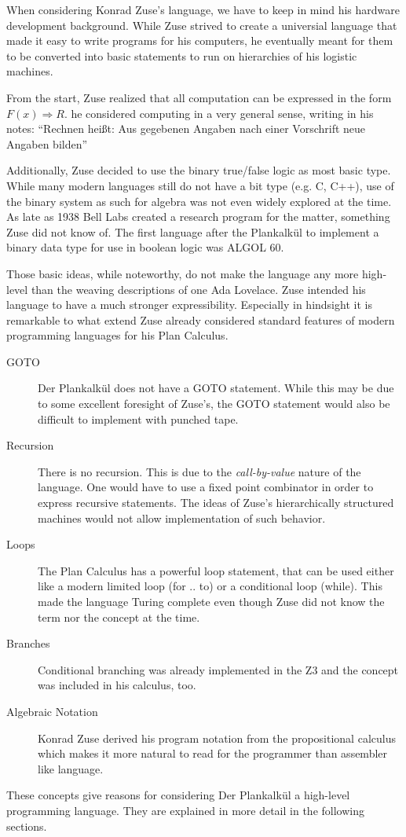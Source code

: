 \documentclass{llncs}
\begin{document}
   When considering Konrad Zuse's language, we have to keep 
   in mind his hardware development background. While Zuse strived 
   to create a universial language that made it easy to write 
   programs for his computers, he eventually meant for them to
   be converted into basic statements to run on hierarchies of 
   his logistic machines.
   
   From the start, Zuse realized that all computation can be expressed 
   in the form $F(x) \Rightarrow R$. he considered computing in a very 
   general sense, writing in his notes: ``Rechnen heißt: Aus
   gegebenen Angaben nach einer Vorschrift neue Angaben bilden''\cite{bauer1972plankalkuel}

   Additionally, Zuse decided to use the binary 
   true/false logic as most basic type. While many modern languages still 
   do not have a bit type (e.g. C, C++), use of the binary system as such 
   for algebra was not even widely explored at the time. As late as 1938 Bell Labs created a 
   research program for the matter, something Zuse did not know of. The first 
   language after the Plankalkül to implement a binary data type for use in 
   boolean logic was ALGOL 60.
   
   Those basic ideas, while noteworthy, do not make the language any more
   high-level than the weaving descriptions of one Ada Lovelace. 
   Zuse intended his language to have a much stronger expressibility. 
   Especially in hindsight it is remarkable 
   to what extend Zuse already considered standard features of modern 
   programming languages for his Plan Calculus.
   
   \begin{description}
     \item[GOTO] Der Plankalkül does not have 
       a GOTO statement. While this may be due to some excellent
       foresight of Zuse's, the GOTO statement would also be
       difficult to implement with punched tape.
     \item[Recursion] There is no recursion.
       This is due to the \emph{call-by-value} nature of the 
       language. One would have to use a fixed point combinator
       in order to express recursive statements. The 
       ideas of Zuse's hierarchically structured machines would not 
       allow implementation of such behavior.
     \item[Loops] The Plan Calculus has a powerful loop statement, 
       that can be used either like a modern limited loop (for .. to) 
       or a conditional loop (while). This made the language Turing
       complete even though Zuse did not know the term nor the 
       concept at the time.
     \item[Branches] Conditional branching was already implemented 
       in the Z3 and the concept was included in his calculus, too.
     \item[Algebraic Notation] Konrad Zuse derived his program 
       notation from the propositional calculus which makes
       it more natural to read for the programmer than assembler like 
       language.
   \end{description}
   These concepts give reasons for considering Der Plankalkül a
   high-level programming language. They are explained in more detail 
   in the following sections.
\end{document}
